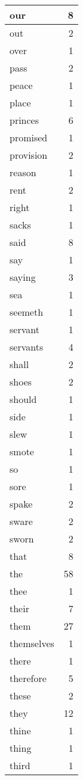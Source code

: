\begin{center}
\begin{longtable}{l|r}
our & 8\\ \hline 
out & 2\\ \hline 
over & 1\\ \hline 
pass & 2\\ \hline 
peace & 1\\ \hline 
place & 1\\ \hline 
princes & 6\\ \hline 
promised & 1\\ \hline 
provision & 2\\ \hline 
reason & 1\\ \hline 
rent & 2\\ \hline 
right & 1\\ \hline 
sacks & 1\\ \hline 
said & 8\\ \hline 
say & 1\\ \hline 
saying & 3\\ \hline 
sea & 1\\ \hline 
seemeth & 1\\ \hline 
servant & 1\\ \hline 
servants & 4\\ \hline 
shall & 2\\ \hline 
shoes & 2\\ \hline 
should & 1\\ \hline 
side & 1\\ \hline 
slew & 1\\ \hline 
smote & 1\\ \hline 
so & 1\\ \hline 
sore & 1\\ \hline 
spake & 2\\ \hline 
sware & 2\\ \hline 
sworn & 2\\ \hline 
that & 8\\ \hline 
the & 58\\ \hline 
thee & 1\\ \hline 
their & 7\\ \hline 
them & 27\\ \hline 
themselves & 1\\ \hline 
there & 1\\ \hline 
therefore & 5\\ \hline 
these & 2\\ \hline 
they & 12\\ \hline 
thine & 1\\ \hline 
thing & 1\\ \hline 
third & 1\\ \hline 

\end{longtable}
\end{center}
